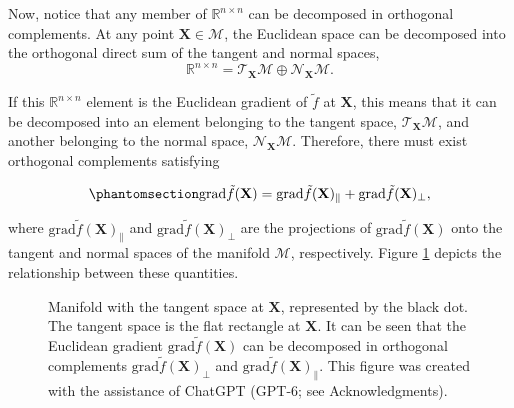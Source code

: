\documentclass[
  12pt,
  letterpaper,
  article]{scrartcl}
\begin{document}
Now, notice that any member of \(\mathbb{R}^{n \times n}\) can be
decomposed in orthogonal complements. At any point
\(\mathbf{X}\in\mathcal{M}\), the Euclidean space can be decomposed into
the orthogonal direct sum of the tangent and normal spaces, \[
\mathbb{R}^{n\times n}
=
\mathcal{T}_\mathbf{X}\mathcal{M}
\oplus
\mathcal{N}_\mathbf{X}\mathcal{M}.
\]

If this \(\mathbb{R}^{n\times n}\) element is the Euclidean gradient of
\(\tilde{f}\) at \(\mathbf{X}\), this means that it can be decomposed
into an element belonging to the tangent space,
\(\mathcal{T}_{\mathbf{X}}\mathcal{M}\), and another belonging to the
normal space, \(\mathcal{N}_{\mathbf{X}}\mathcal{M}\). Therefore, there
must exist orthogonal complements satisfying

\begin{equation}\protect\phantomsection\label{eq-orth_compl_grad}{
\text{grad}\tilde{f}(\mathbf{X}) = \text{grad}\tilde{f}(\mathbf{X})_\parallel + \text{grad}\tilde{f}(\mathbf{X})_\perp,
}\end{equation}

where \(\text{grad}\tilde{f}(\mathbf{X})_\parallel\) and
\(\text{grad}\tilde{f}(\mathbf{X})_\perp\) are the projections of
\(\text{grad}\tilde{f}(\mathbf{X})\) onto the tangent and normal spaces
of the manifold \(\mathcal{M}\), respectively. Figure
\ref{fig:tangent-gradient} depicts the relationship between these
quantities.

\begin{figure}[!ht]
\centering
{}
\caption{Manifold with the tangent space at $\mathbf{X}$, represented by the black dot. The tangent space is the flat rectangle at $\mathbf{X}$. It can be seen that the Euclidean gradient $\text{grad}\tilde{f}(\mathbf{X})$ can be decomposed in orthogonal complements $\text{grad}\tilde{f}(\mathbf{X})_\perp$ and $\text{grad}\tilde{f}(\mathbf{X})_\parallel$. This figure was created with the assistance of ChatGPT (GPT-6; see Acknowledgments).}
\label{fig:tangent-gradient}
\end{figure}
\end{document}

